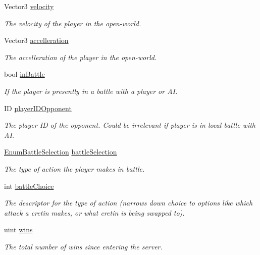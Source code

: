 \begin{DoxyCompactItemize}
Vector3 \hyperlink{class_game_state_1_1_player_aa22122c85cfdae428d82bd1571ab022a}{velocity}
\begin{DoxyCompactList}\small\item\em The velocity of the player in the open-\/world. \end{DoxyCompactList}\item 
Vector3 \hyperlink{class_game_state_1_1_player_a8f25769e000454ef477d359f44a5ed31}{accelleration}
\begin{DoxyCompactList}\small\item\em The accelleration of the player in the open-\/world. \end{DoxyCompactList}\item 
bool \hyperlink{class_game_state_1_1_player_a3cff343fceb3dc315d2371fc8fe25ec6}{in\-Battle}
\begin{DoxyCompactList}\small\item\em If the player is presently in a battle with a player or A\-I. \end{DoxyCompactList}\item 
I\-D \hyperlink{class_game_state_1_1_player_aaed188c94b7f6be4dabe39744aa818ca}{player\-I\-D\-Opponent}
\begin{DoxyCompactList}\small\item\em The player I\-D of the opponent. Could be irrelevant if player is in local battle with A\-I. \end{DoxyCompactList}\item 
\hyperlink{class_game_state_1_1_player_a9f54c5eca1e60acbaa2074e981f51615}{Enum\-Battle\-Selection} \hyperlink{class_game_state_1_1_player_a123c8ee2ef6e66e88bcca1a80f73ab4a}{battle\-Selection}
\begin{DoxyCompactList}\small\item\em The type of action the player makes in battle. \end{DoxyCompactList}\item 
int \hyperlink{class_game_state_1_1_player_a3bfa8ea6e2067982474dc4f6073061c5}{battle\-Choice}
\begin{DoxyCompactList}\small\item\em The descriptor for the type of action (narrows down choice to options like which attack a cretin makes, or what cretin is being swapped to). \end{DoxyCompactList}\item 
uint \hyperlink{class_game_state_1_1_player_a3a4d13459cad9bd58e058ddc6387af70}{wins}
\begin{DoxyCompactList}\small\item\em The total number of wins since entering the server. \end{DoxyCompactList}\item 

\end{DoxyCompactItemize}
